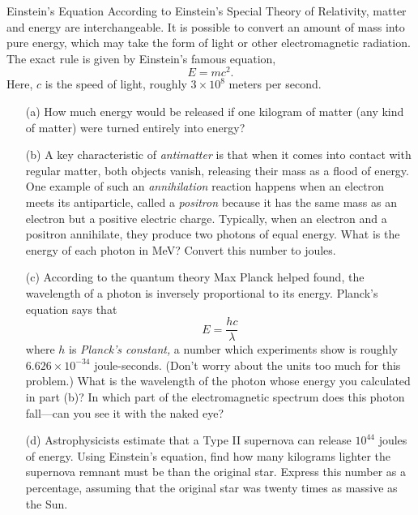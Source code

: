 \documentclass[12pt]{article}
\begin{document}
\begin{probdesc}{8}{Einstein's Equation}
According to Einstein's Special Theory of Relativity, matter and
energy are interchangeable.  It is possible to convert an amount of
mass into pure energy, which may take the form of light or other
electromagnetic radiation.  The exact rule is given by Einstein's
famous equation,
\begin{equation}
E = mc^2.
\end{equation}
Here, $c$ is the speed of light, roughly $3\times10^8$ meters per
second.
\begin{enumerate}
\item[(a)] How much energy would be released if one kilogram of matter (any
  kind of matter) were turned entirely into energy?

\item[(b)] A key characteristic of {\em antimatter} is that when it comes
  into contact with regular matter, both objects vanish, releasing
  their mass as a flood of energy.  One example of such an {\em
  annihilation} reaction happens when an electron meets its
  antiparticle, called a {\em positron} because it has the same mass
  as an electron but a positive electric charge.  Typically, when an
  electron and a positron annihilate, they produce two photons of
  equal energy.  What is the energy of each photon in MeV?  Convert
  this number to joules.

\item[(c)] According to the quantum theory Max Planck helped found, the
  wavelength of a photon is inversely proportional to its energy.
  Planck's equation says that
  \begin{equation}
    E = \frac{hc}{\lambda}
  \end{equation}
  where $h$ is {\em Planck's constant,} a number which experiments
  show is roughly $6.626\times10^{-34}$ joule-seconds.  (Don't worry
  about the units too much for this problem.)  What is the wavelength
  of the photon whose energy you calculated in part (b)?  In which
  part of the electromagnetic spectrum does this photon fall---can you
  see it with the naked eye?

\item[(d)] Astrophysicists estimate that a Type II supernova can
  release $10^{44}$ joules of energy.  Using Einstein's equation, find
  how many kilograms lighter the supernova remnant must be than the
  original star.  Express this number as a percentage, assuming that
  the original star was twenty times as massive as the Sun.
\end{enumerate}
\end{probdesc}
\end{document}
